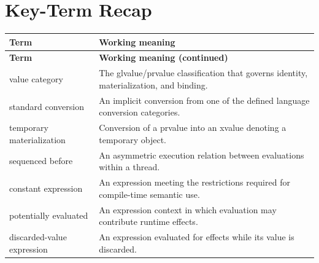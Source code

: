 \documentclass[11pt,letterpaper]{article}
\begin{document}
\section{Key-Term Recap}
\begin{longtable}{@{}>{\RaggedRight\arraybackslash}p{}>{\RaggedRight\arraybackslash}p{}@{}}\toprule\textbf{Term} & \textbf{Working meaning}\\\midrule\endfirsthead\toprule\textbf{Term} & \textbf{Working meaning (continued)}\\\midrule\endhead\bottomrule\endfoot
value category & The glvalue/prvalue classification that governs identity, materialization, and binding.\\
standard conversion & An implicit conversion from one of the defined language conversion categories.\\
temporary materialization & Conversion of a prvalue into an xvalue denoting a temporary object.\\
sequenced before & An asymmetric execution relation between evaluations within a thread.\\
constant expression & An expression meeting the restrictions required for compile-time semantic use.\\
potentially evaluated & An expression context in which evaluation may contribute runtime effects.\\
discarded-value expression & An expression evaluated for effects while its value is discarded.\\
\end{longtable}
\end{document}
